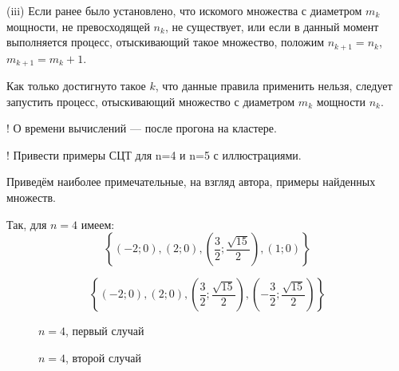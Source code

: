 \documentclass{article}
\begin{document}
(iii)
Если ранее было установлено, что искомого множества с диаметром $m_k$ мощности, не превосходящей $n_k$, не существует,
или если в данный момент выполняется процесс, отыскивающий такое множество, положим $n_{k+1} = n_k$, $m_{k+1} = m_k+1$.

Как только достигнуто такое $k$, что данные правила применить нельзя, следует запустить процесс, отыскивающий множество с диаметром $m_k$ мощности $n_k$.




! О времени вычислений --- после прогона на кластере.

! Привести примеры СЦТ для n=4 и n=5 с иллюстрациями.


Приведём наиболее примечательные, на взгляд автора, примеры найденных множеств.

Так, для $n=4$ имеем:
$$
\left\{\left( -2 ; 0\right),\left( 2 ; 0\right),\left( \frac{3}{2} ; \frac{\sqrt{15}}{2}\right),\left( 1 ; 0\right)\right\}
$$

$$
\left\{\left( -2 ; 0\right),\left( 2 ; 0\right),\left( \frac{3}{2} ; \frac{\sqrt{15}}{2}\right),\left( -\frac{3}{2} ; \frac{\sqrt{15}}{2}\right)\right\}
$$


\begin{figure}[h]
\caption{$n=4$, первый случай}
\label{ris:image}
\end{figure}

\begin{figure}[h]
\caption{$n=4$, второй случай}
\label{ris:image}
\end{figure}
\end{document}
